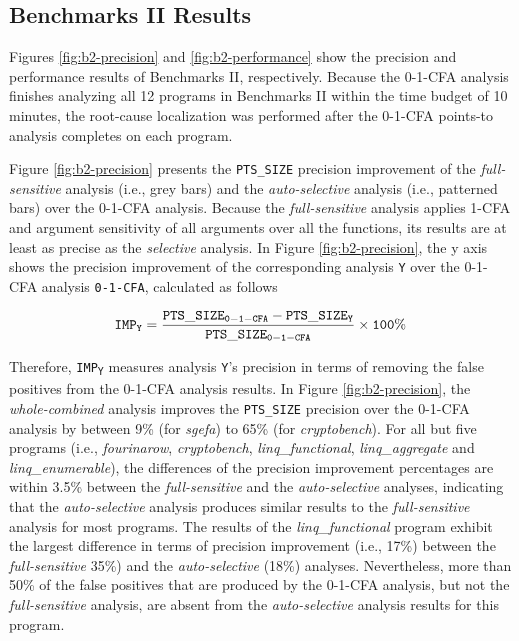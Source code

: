 \subsection{Benchmarks II Results}
\label{b2-res}

Figures \ref{fig:b2-precision} and \ref{fig:b2-performance} show the precision and performance results of Benchmarks II, respectively. Because the 0-1-CFA analysis finishes analyzing all 12 programs in Benchmarks II within the time budget of 10 minutes, the root-cause localization was performed after the 0-1-CFA points-to analysis completes on each program.

Figure \ref{fig:b2-precision} presents the {\tt PTS\_SIZE} precision improvement of the {\it full-sensitive} analysis (i.e., grey bars) and the {\it auto-selective} analysis (i.e., patterned bars) over the 0-1-CFA analysis. Because the {\it full-sensitive} analysis applies 1-CFA and argument sensitivity of all arguments over all the functions, its results are at least as precise as the {\it selective} analysis. In Figure \ref{fig:b2-precision}, the y axis shows the precision improvement of the corresponding analysis {\tt Y} over the 0-1-CFA analysis {\tt 0-1-CFA}, calculated as follows

\[
  {\tt IMP_{Y} = {{PTS\_SIZE_{0-1-CFA} - PTS\_SIZE_{Y}} \over {PTS\_SIZE_{0-1-CFA}}} \times 100\%}
\]

Therefore, {\tt IMP\textsubscript{Y}} measures analysis {\tt Y}'s precision in terms of removing the false positives from the 0-1-CFA analysis results. In Figure \ref{fig:b2-precision}, the {\it whole-combined} analysis improves the {\tt PTS\_SIZE} precision over the 0-1-CFA analysis by between 9\% (for {\it sgefa}) to 65\% (for {\it cryptobench}). For all but five programs (i.e., {\it fourinarow}, {\it cryptobench}, {\it linq\_functional}, {\it linq\_aggregate} and {\it linq\_enumerable}), the differences of the precision improvement percentages are within 3.5\% between the {\it full-sensitive} and the {\it auto-selective} analyses, indicating that the {\it auto-selective} analysis produces similar results to the {\it full-sensitive} analysis for most programs. The results of the {\it linq\_functional} program exhibit the largest difference in terms of precision improvement (i.e., 17\%) between the {\it full-sensitive} 35\%) and the {\it auto-selective} (18\%) analyses. Nevertheless, more than 50\% of the false positives that are produced by the 0-1-CFA analysis, but not the {\it full-sensitive} analysis, are absent from the {\it auto-selective} analysis results for this program.

